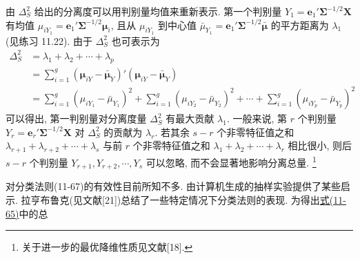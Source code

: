 由 $\Delta_S^2$ 给出的分离度可以用判别量均值来重新表示. 第一个判别量 $Y_1=\mathbf{e}_1'\boldsymbol{\Sigma}^{-1/2}\mathbf{X}$ 有均值 $\mu_{iY_1}=\mathbf{e}_1'\boldsymbol{\Sigma}^{-1/2}\boldsymbol{\mu}_i$, 且从 $\mu_{iY_1}$ 到中心值 $\bar{\mu}_{Y_1}=\mathbf{e}_1'\boldsymbol{\Sigma}^{-1/2}\bar{\boldsymbol{\mu}}$ 的平方距离为 $\lambda_1$(见练习 11.22). 由于 $\Delta_S^2$ 也可表示为
\[
\begin{aligned}
\Delta_S^2&=\lambda_1+\lambda_2+\cdots+\lambda_p\\
&=\sum_{i=1}^{g}(\boldsymbol{\mu}_{iY}-\bar{\boldsymbol{\mu}}_Y)'(\boldsymbol{\mu}_{iY}-\bar{\boldsymbol{\mu}}_Y)\\
&=\sum_{i=1}^{g}(\mu_{iY_1}-\bar{\mu}_{Y_1})^2+\sum_{i=1}^{g}(\mu_{iY_2}-\bar{\mu}_{Y_2})^2+\cdots+\sum_{i=1}^{g}(\mu_{iY_p}-\bar{\mu}_{Y_p})^2
\end{aligned}
\]
可以得出, 第一判别量对分离度量 $\Delta_S^2$ 有最大贡献 $\lambda_1$. 一般来说, 第 $r$ 个判别量 $Y_r=\mathbf{e}_r'\boldsymbol{\Sigma}^{-1/2}\mathbf{X}$ 对 $\Delta_S^2$ 的贡献为 $\lambda_r$. 若其余 $s-r$ 个非零特征值之和 $\lambda_{r+1}+\lambda_{r+2}+\cdots+\lambda_s$ 与前 $r$ 个非零特征值之和 $\lambda_1+\lambda_2+\cdots+\lambda_r$ 相比很小, 则后 $s-r$ 个判别量 $Y_{r+1},Y_{r+2},\cdots,Y_s$ 可以忽略, 而不会显著地影响分离总量. \footnote{关于进一步的最优降维性质见文献[18].}

对分类法则(11-67)的有效性目前所知不多. 由计算机生成的抽样实验提供了某些启示. 拉亨布鲁克(见文献[21])总结了一些特定情况下分类法则的表现. 为得出\hyperref[eq:11-65]{式(11-65)}中的总
